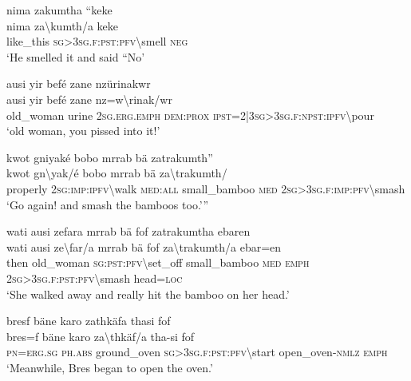 \ea\label{ex:8:a1737}
nima zakumtha ``keke\\
\gll nima	za{\textbackslash}kumth/a	keke\\
     like\_this	\textsc{sg}>3\textsc{sg}.\textsc{f}:\textsc{pst}:\textsc{pfv}{\textbackslash}smell	\textsc{neg}\\
\glt `He smelled it and said ``No'
\z

\ea\label{ex:8:a1738}
ausi yir befé zane nzürinakwr\\
\gll ausi	yir	befé	zane	nz=w{\textbackslash}rinak/wr\\
     old\_woman	urine	2\textsc{sg}.\textsc{erg}.\textsc{emph}	\textsc{dem}:\textsc{prox}	\textsc{ipst}=2|3\textsc{sg}>3\textsc{sg}.\textsc{f}:\textsc{npst}:\textsc{ipfv}{\textbackslash}pour\\
\glt `old woman, you pissed into it!'
\z

\ea\label{ex:8:a1739}
kwot gniyaké bobo mrrab bä zatrakumth''\\
\gll kwot	gn{\textbackslash}yak/é	bobo	mrrab	bä	za{\textbackslash}trakumth/\\
     properly	2\textsc{sg}:\textsc{imp}:\textsc{ipfv}{\textbackslash}walk	\textsc{med}:\textsc{all}	small\_bamboo	\textsc{med}	2\textsc{sg}>3\textsc{sg}.\textsc{f}:\textsc{imp}:\textsc{pfv}{\textbackslash}smash\\
\glt `Go again! and smash the bamboos too.'''
\z

\ea\label{ex:8:a1741}
wati ausi zefara mrrab bä fof zatrakumtha ebaren\\
\gll wati	ausi	ze{\textbackslash}far/a	mrrab	bä	fof	za{\textbackslash}trakumth/a	ebar=en\\
     then	old\_woman	\textsc{sg}:\textsc{pst}:\textsc{pfv}{\textbackslash}set\_off	small\_bamboo	\textsc{med}	\textsc{emph}	2\textsc{sg}>3\textsc{sg}.\textsc{f}:\textsc{pst}:\textsc{pfv}{\textbackslash}smash	head=\textsc{loc}\\
\glt `She walked away and really hit the bamboo on her head.'
\z

\ea\label{ex:8:a1743}
bresf bäne karo zathkäfa thasi fof\\
\gll bres=f	bäne	karo	za{\textbackslash}thkäf/a	tha-si	fof\\
     \textsc{pn}=\textsc{erg}.\textsc{sg}	\textsc{ph}.\textsc{abs}	ground\_oven	\textsc{sg}>3\textsc{sg}.\textsc{f}:\textsc{pst}:\textsc{pfv}{\textbackslash}start	open\_oven-\textsc{nmlz}	\textsc{emph}\\
\glt `Meanwhile, Bres began to open the oven.'
\z

